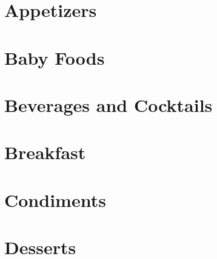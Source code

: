\documentclass{report}
\begin{document}
    \tableofcontents

    \chapter{Appetizers}

    
    \newpage
    
    \newpage

    \chapter{Baby Foods}

    
    \newpage
    
    \newpage

    \chapter{Beverages and Cocktails}

    
    \newpage
    
    \newpage
    
    \newpage

    \chapter{Breakfast}

    
    \newpage
    
    \newpage
    
    \newpage
    
    \newpage

    \chapter{Condiments}

    
    \newpage
    
    \newpage
    
    \newpage
    
    \newpage
    
    \newpage
    
    \newpage

    \chapter{Desserts}
\end{document}
